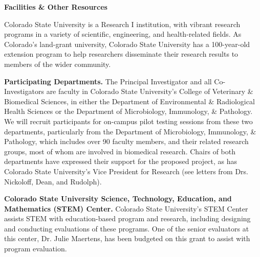 \documentclass[pdftex,english,11.5pt,parskip=half]{scrartcl}
\begin{document}
\def\bf{\normalfont\bfseries}
\pagestyle{empty}

{\large \textbf{Facilities \& Other Resources}}

% 

Colorado State University is a Research I institution, with vibrant research programs in a variety of scientific, engineering, and health-related fields. As Colorado’s land-grant university, Colorado State University has a 100-year-old extension program to help researchers disseminate their research results to members of the wider community. 

\textbf{Participating Departments.} The Principal Investigator and all Co-Investigators are faculty in Colorado State University's College of Veterinary \& Biomedical Sciences, in either the Department of Environmental \& Radiological Health Sciences or the Department of Microbiology, Immunology, \& Pathology. We will recruit participants for on-campus pilot testing sessions from these two departments, particularly from the Department of Microbiology, Immunology, \& Pathology, which includes over 90 faculty members, and their related research groups, most of whom are involved in biomedical research. Chairs of both departments have expressed their support for the proposed project, as has Colorado State University's Vice President for Research (see letters from Drs. Nickoloff, Dean, and Rudolph).

\textbf{Colorado State University Science, Technology, Education, and Mathematics (STEM) Center.} Colorado State University's STEM Center assists STEM with education-based program and research, including designing and conducting evaluations of these programs. One of the senior evaluators at this center, Dr. Julie Maertens, has been budgeted on this grant to assist with program evaluation.
\end{document}
